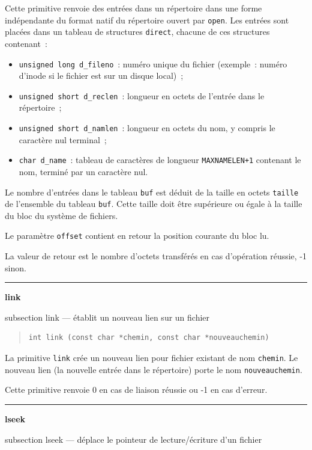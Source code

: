 \documentclass [twoside] {report}
\newcommand {\primitive} [1]
    {
	\phantomsection
	{\large \textbf {#1}}
	\addcontentsline {toc} {subsection} {#1}
    }
\newcommand {\separation}
    {
	\vspace {5mm}
	\nopagebreak
	\hrule
    }
\begin{document}
Cette primitive renvoie des entrées dans un répertoire dans une
forme indépendante du format natif du répertoire ouvert par \texttt {open}.
Les entrées sont placées dans un tableau de structures \texttt {direct},
chacune de ces structures contenant~:

\begin {itemize}
    \item \texttt {unsigned long d\_fileno}~:  numéro unique du fichier
	(exemple~:  numéro d'inode si le fichier est sur un disque
	local)~;
    \item \texttt {unsigned short d\_reclen}~: longueur en octets de l'entrée
	dans le répertoire~;
    \item \texttt {unsigned short d\_namlen}~: longueur en octets du nom, y
	compris le caractère nul terminal~;
    \item \texttt {char d\_name}~: tableau de caractères de longueur
	\texttt {MAXNAMELEN+1} contenant le nom, terminé par un
	caractère nul.

\end {itemize}

Le nombre d'entrées dans le tableau \texttt {buf} est déduit de la taille en
octets \texttt {taille} de l'ensemble du tableau \texttt {buf}. Cette taille
doit être supérieure ou égale à la taille du bloc du système de
fichiers.

Le paramètre \texttt {offset} contient en retour la position courante du bloc
lu.

La valeur de retour est le nombre d'octets transférés en cas d'opération
réussie, -1 sinon.


\separation
\primitive {link} --- établit un nouveau lien sur un fichier

\begin {quote}
\begin {verbatim}
int link (const char *chemin, const char *nouveauchemin)
\end{verbatim}
\end {quote}

La primitive \texttt {link} crée un nouveau lien pour
fichier existant de nom \texttt {chemin}. Le nouveau lien
(la nouvelle entrée dans le répertoire) porte
le nom \texttt {nouveauchemin}.

Cette primitive renvoie 0 en cas de liaison
réussie ou -1 en cas d'erreur.




\separation
\primitive {lseek} --- déplace le pointeur de lecture/écriture d'un fichier
\end{document}
